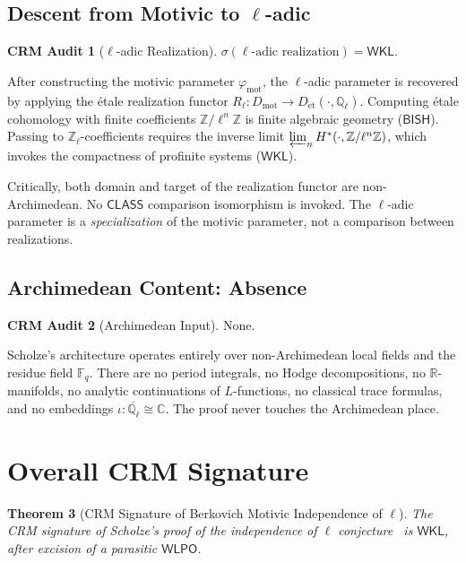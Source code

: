 \documentclass[11pt,a4paper]{article}
\theoremstyle{plain}
\newtheorem{theorem}{Theorem}[section]
\theoremstyle{definition}
\newtheorem{audit}[theorem]{CRM Audit}
\newcommand{\BISH}{\textsf{BISH}}
\newcommand{\WKL}{\textsf{WKL}}
\newcommand{\WLPO}{\textsf{WLPO}}
\newcommand{\CLASS}{\textsf{CLASS}}
\newcommand{\Dmot}{D_{\mathrm{mot}}}
\newcommand{\Z}{\mathbb{Z}}
\newcommand{\Q}{\mathbb{Q}}
\newcommand{\R}{\mathbb{R}}
\newcommand{\C}{\mathbb{C}}
\newcommand{\F}{\mathbb{F}}
\newcommand{\sig}{\sigma}
\begin{document}
\subsection{Descent from Motivic to $\ell$-adic}

\begin{audit}[$\ell$-adic Realization]\label{audit:realization}
$\sig(\text{$\ell$-adic realization}) = \WKL$.
\end{audit}

After constructing the motivic parameter $\varphi_{\mathrm{mot}}$, the $\ell$-adic parameter is recovered by applying the \'etale realization functor $R_\ell: \Dmot \to D_{\mathrm{\acute{e}t}}(\cdot, \Q_\ell)$. Computing \'etale cohomology with finite coefficients $\Z/\ell^n\Z$ is finite algebraic geometry ($\BISH$). Passing to $\Z_\ell$-coefficients requires the inverse limit $\varprojlim_n H^*(\cdot, \Z/\ell^n\Z)$, which invokes the compactness of profinite systems ($\WKL$).

Critically, both domain and target of the realization functor are non-Archimedean. No $\CLASS$ comparison isomorphism is invoked. The $\ell$-adic parameter is a \emph{specialization} of the motivic parameter, not a comparison between realizations.


\subsection{Archimedean Content: Absence}

\begin{audit}[Archimedean Input]\label{audit:arch}
None.
\end{audit}

Scholze's architecture operates entirely over non-Archimedean local fields and the residue field $\F_q$. There are no period integrals, no Hodge decompositions, no $\R$-manifolds, no analytic continuations of $L$-functions, no classical trace formulas, and no embeddings $\iota: \overline{\Q_\ell} \cong \C$. The proof never touches the Archimedean place.


\section{Overall CRM Signature}\label{sec:signature}

\begin{theorem}[CRM Signature of Berkovich Motivic Independence of $\ell$]\label{thm:signature}
The CRM signature of Scholze's proof of the independence of $\ell$ conjecture~\cite{scholze-berkovich, scholze-motivic-geometrization} is $\WKL$, after excision of a parasitic $\WLPO$.
\end{theorem}
\end{document}
